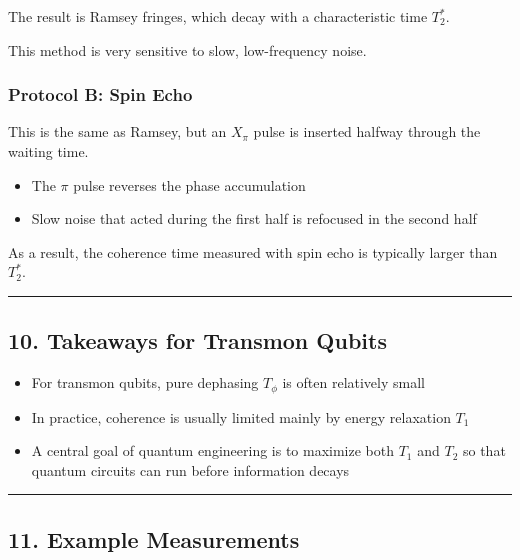 \documentclass[
]{article}
\providecommand{\tightlist}{%
  \setlength{\itemsep}{0pt}\setlength{\parskip}{0pt}}
\begin{document}
The result is Ramsey fringes, which decay with a characteristic time
\(T_2^*\).

This method is very sensitive to slow, low-frequency noise.

\subsubsection{Protocol B: Spin Echo}\label{protocol-b-spin-echo}

This is the same as Ramsey, but an \(X_\pi\) pulse is inserted halfway
through the waiting time.

\begin{itemize}
\tightlist
\item
  The \(\pi\) pulse reverses the phase accumulation
\item
  Slow noise that acted during the first half is refocused in the second
  half
\end{itemize}

As a result, the coherence time measured with spin echo is typically
larger than \(T_2^*\).

\begin{center}\rule{0.5\linewidth}{0.5pt}\end{center}

\subsection{10. Takeaways for Transmon
Qubits}\label{takeaways-for-transmon-qubits}

\begin{itemize}
\tightlist
\item
  For transmon qubits, pure dephasing \(T_\phi\) is often relatively
  small
\item
  In practice, coherence is usually limited mainly by energy relaxation
  \(T_1\)
\item
  A central goal of quantum engineering is to maximize both \(T_1\) and
  \(T_2\) so that quantum circuits can run before information decays
\end{itemize}

\begin{center}\rule{0.5\linewidth}{0.5pt}\end{center}

\subsection{11. Example Measurements}\label{example-measurements}
\end{document}
